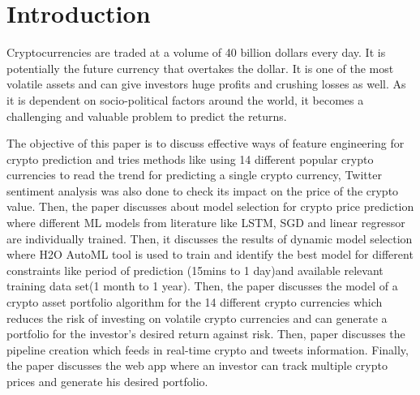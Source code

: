 \documentclass[final]{cvpr}
\begin{document}
\section{Introduction}

Cryptocurrencies are traded at a volume of 40 billion dollars every day. It is potentially the future currency that overtakes the dollar. It is one of the most volatile assets and can give investors huge profits and crushing losses as well. As it is dependent on socio-political factors around the world, it becomes a challenging and valuable problem to predict the returns.

The objective of this paper is to discuss effective ways of feature engineering for crypto prediction and tries methods like using 14 different popular crypto currencies to read the trend for predicting a single crypto currency, Twitter sentiment analysis was also done to check its impact on the price of the crypto value. Then, the paper discusses about model selection for crypto price prediction where different ML models from literature like LSTM, SGD and linear regressor are individually trained. Then, it discusses the results of dynamic model selection where H2O AutoML tool is used to train and identify the best model for different constraints like period of prediction (15mins to 1 day)and available relevant training data set(1 month to 1 year). Then, the paper discusses the model of a crypto asset portfolio algorithm for the 14 different crypto currencies which reduces the risk of investing on volatile crypto currencies and can generate a portfolio for the investor's desired return against risk. Then, paper discusses the pipeline creation which feeds in real-time crypto and tweets information. Finally, the paper discusses the web app where an investor can track multiple crypto prices and generate his desired portfolio.
\end{document}
